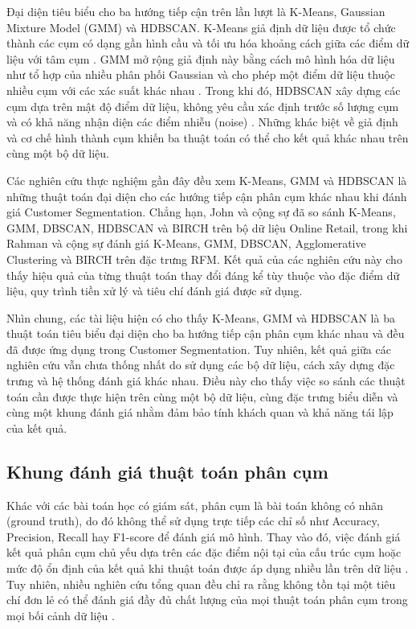 \documentclass[12pt]{ai_conquer2026}
\begin{document}
Đại diện tiêu biểu cho ba hướng tiếp cận trên lần lượt là K-Means, Gaussian Mixture Model (GMM) và HDBSCAN. K-Means giả định dữ liệu được tổ chức thành các cụm có dạng gần hình cầu và tối ưu hóa khoảng cách giữa các điểm dữ liệu với tâm cụm \cite{MacQueen1967}. GMM mở rộng giả định này bằng cách mô hình hóa dữ liệu như tổ hợp của nhiều phân phối Gaussian và cho phép một điểm dữ liệu thuộc nhiều cụm với các xác suất khác nhau \cite{Bishop2006}. Trong khi đó, HDBSCAN xây dựng các cụm dựa trên mật độ điểm dữ liệu, không yêu cầu xác định trước số lượng cụm và có khả năng nhận diện các điểm nhiễu (noise) \cite{Campello2015}. Những khác biệt về giả định và cơ chế hình thành cụm khiến ba thuật toán có thể cho kết quả khác nhau trên cùng một bộ dữ liệu.

Các nghiên cứu thực nghiệm gần đây đều xem K-Means, GMM và HDBSCAN là những thuật toán đại diện cho các hướng tiếp cận phân cụm khác nhau khi đánh giá Customer Segmentation. Chẳng hạn, John và cộng sự \cite{John2023} đã so sánh K-Means, GMM, DBSCAN, HDBSCAN và BIRCH trên bộ dữ liệu Online Retail, trong khi Rahman và cộng sự \cite{Rahman2023} đánh giá K-Means, GMM, DBSCAN, Agglomerative Clustering và BIRCH trên đặc trưng RFM. Kết quả của các nghiên cứu này cho thấy hiệu quả của từng thuật toán thay đổi đáng kể tùy thuộc vào đặc điểm dữ liệu, quy trình tiền xử lý và tiêu chí đánh giá được sử dụng.

Nhìn chung, các tài liệu hiện có cho thấy K-Means, GMM và HDBSCAN là ba thuật toán tiêu biểu đại diện cho ba hướng tiếp cận phân cụm khác nhau và đều đã được ứng dụng trong Customer Segmentation. Tuy nhiên, kết quả giữa các nghiên cứu vẫn chưa thống nhất do sử dụng các bộ dữ liệu, cách xây dựng đặc trưng và hệ thống đánh giá khác nhau. Điều này cho thấy việc so sánh các thuật toán cần được thực hiện trên cùng một bộ dữ liệu, cùng đặc trưng biểu diễn và cùng một khung đánh giá nhằm đảm bảo tính khách quan và khả năng tái lập của kết quả.

\subsection{Khung đánh giá thuật toán phân cụm}

Khác với các bài toán học có giám sát, phân cụm là bài toán không có nhãn (ground truth), do đó không thể sử dụng trực tiếp các chỉ số như Accuracy, Precision, Recall hay F1-score để đánh giá mô hình. Thay vào đó, việc đánh giá kết quả phân cụm chủ yếu dựa trên các đặc điểm nội tại của cấu trúc cụm hoặc mức độ ổn định của kết quả khi thuật toán được áp dụng nhiều lần trên dữ liệu \cite{Jain2010,Arbelaitz2013}. Tuy nhiên, nhiều nghiên cứu tổng quan đều chỉ ra rằng không tồn tại một tiêu chí đơn lẻ có thể đánh giá đầy đủ chất lượng của mọi thuật toán phân cụm trong mọi bối cảnh dữ liệu \cite{Jain2010,Arbelaitz2013,Validity2021}.
\end{document}
